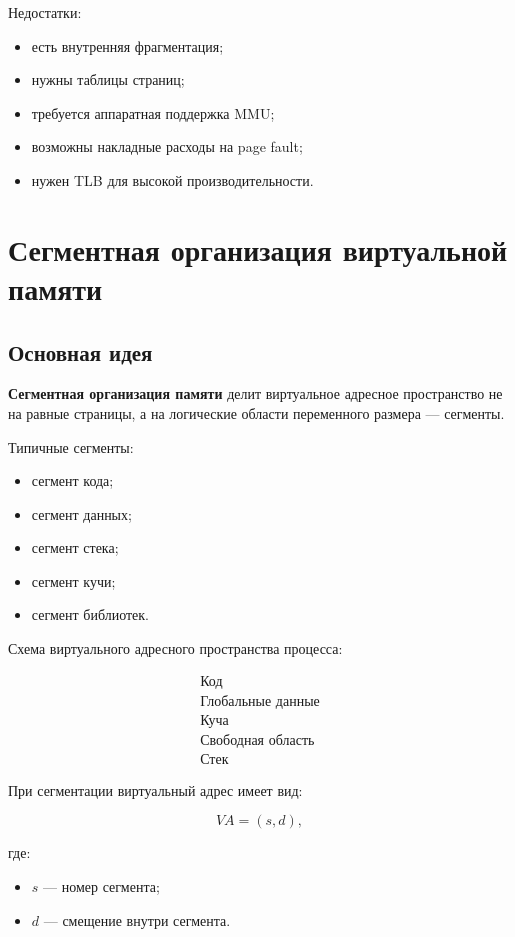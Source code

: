 \documentclass[12pt,a4paper]{article}
\theoremstyle{remark}
\begin{document}
Недостатки:
\begin{itemize}
    \item есть внутренняя фрагментация;
    \item нужны таблицы страниц;
    \item требуется аппаратная поддержка MMU;
    \item возможны накладные расходы на page fault;
    \item нужен TLB для высокой производительности.
\end{itemize}

\section{Сегментная организация виртуальной памяти}

\subsection{Основная идея}

\textbf{Сегментная организация памяти} делит виртуальное адресное пространство не на равные страницы, а на логические области переменного размера --- сегменты.

Типичные сегменты:
\begin{itemize}
    \item сегмент кода;
    \item сегмент данных;
    \item сегмент стека;
    \item сегмент кучи;
    \item сегмент библиотек.
\end{itemize}

Схема виртуального адресного пространства процесса:

\[
\begin{array}{c}
\boxed{\text{Код}} \\
\boxed{\text{Глобальные данные}} \\
\boxed{\text{Куча}} \\
\boxed{\text{Свободная область}} \\
\boxed{\text{Стек}}
\end{array}
\]

При сегментации виртуальный адрес имеет вид:

\[
VA = (s, d),
\]

где:
\begin{itemize}
    \item $s$ --- номер сегмента;
    \item $d$ --- смещение внутри сегмента.
\end{itemize}
\end{document}
